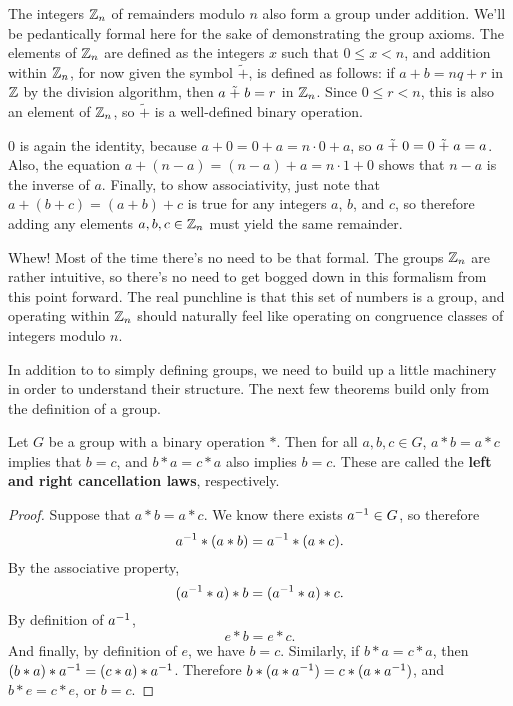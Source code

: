 \begin{example}
The integers $\zn[n]$ of remainders modulo $n$ also form a group under addition. We'll be pedantically formal here for the sake of demonstrating the group axioms. The elements of $\zn[n]$ are defined as the integers $x$ such that $0 \leq x < n$, and addition within $\zn[n]$, for now given the symbol $\tilde +$, is defined as follows: if $a + b = nq + r$ in $\z$ by the division algorithm, then $a \np b = r$ in $\zn[n]$. Since $0 \leq r < n$, this is also an element of $\zn[n]$, so $\tilde{+}$ is a well-defined binary operation.

$0$ is again the identity, because $a + 0 = 0 + a = n\cdot 0 + a$, so $a \np 0 = 0 \np a = a$. Also, the equation $a + (n-a) = (n-a) + a = n\cdot 1 + 0$ shows that $n-a$ is the inverse of $a$. Finally, to show associativity, just note that $a + (b + c) = (a + b) + c$ is true for any integers $a$, $b$, and $c$, so therefore adding any elements $a, b, c \in \zn[n]$ must yield the same remainder.
\end{example}

Whew! Most of the time there's no need to be that formal. The groups $\zn[n]$ are rather intuitive, so there's no need to get bogged down in this formalism from this point forward. The real punchline is that this set of numbers is a group, and operating within $\zn[n]$ should naturally feel like operating on congruence classes of integers modulo $n$.

In addition to to simply defining groups, we need to build up a little machinery in order to understand their structure. The next few theorems build only from the definition of a group.

\begin{theorem}
Let $G$ be a group with a binary operation $*$. Then for all $a, b, c \in G$, $a * b = a * c$ implies that $b = c$, and $b*a = c*a$ also implies $b=c$. These are called the \textbf{left and right cancellation laws}, respectively.
\end{theorem}

\begin{proof}
Suppose that $a*b = a*c$. We know there exists $\inv{a} \in G$, so therefore
\begin{equation*}
    \inv{a} * (a*b) = \inv{a} * (a*c).
\end{equation*}
By the associative property,
\begin{equation*}
    (\inv{a} * a) * b = (\inv{a} * a) * c.
\end{equation*}
By definition of $\inv{a}$,
\begin{equation*}
    e * b = e * c.
\end{equation*}
And finally, by definition of $e$, we have $b = c$. Similarly, if $b*a = c*a$, then $(b*a)*\inv{a} = (c*a)*\inv{a}$. Therefore $b*(a*\inv{a}) = c*(a*\inv{a})$, and $b*e = c*e$, or $b = c$.

\end{proof}

